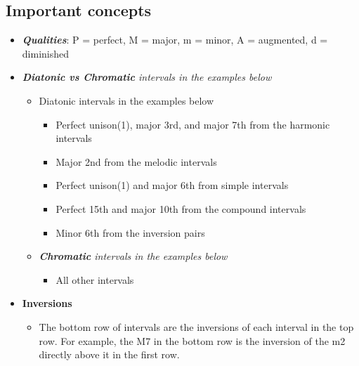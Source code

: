 \documentclass{book}
\providecommand{\tightlist}{%
  \setlength{\itemsep}{0pt}\setlength{\parskip}{0pt}}
\begin{document}
\hypertarget{important-concepts}{%
\subsection{Important concepts}\label{important-concepts}}

\begin{itemize}
\tightlist
\item
  \emph{\textbf{Qualities}}: P = perfect, M = major, m = minor, A = augmented,
  d = diminished
\item
  \emph{\textbf{Diatonic vs Chromatic} intervals in the examples below}

  \begin{itemize}
  \tightlist
  \item
    Diatonic intervals in the examples below

    \begin{itemize}
    \tightlist
    \item
      Perfect unison(1), major 3rd, and major 7th from the harmonic intervals
    \item
      Major 2nd from the melodic intervals
    \item
      Perfect unison(1) and major 6th from simple intervals
    \item
      Perfect 15th and major 10th from the compound intervals
    \item
      Minor 6th from the inversion pairs
    \end{itemize}
  \item
    \emph{\textbf{Chromatic} intervals in the examples below}

    \begin{itemize}
    \tightlist
    \item
      All other intervals
    \end{itemize}
  \end{itemize}
\item
  \textbf{Inversions}

  \begin{itemize}
  \tightlist
  \item
    The bottom row of intervals are the inversions of each interval in the top
    row. For example, the M7 in the bottom row is the inversion of the m2
    directly above it in the first row.
  \end{itemize}
\end{itemize}
\end{document}
